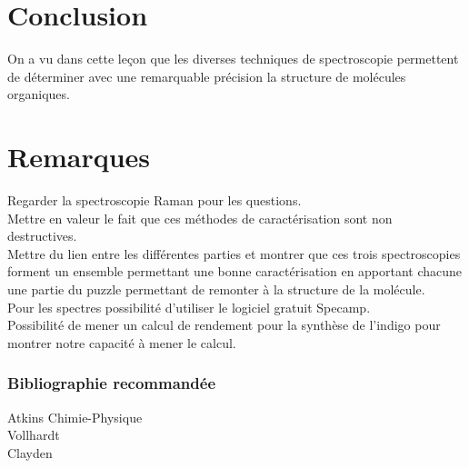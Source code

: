 \documentclass[12pt,prb,aps,epsf]{report}
\begin{document}
\section{Conclusion}
On a vu dans cette leçon que les diverses techniques de spectroscopie permettent de déterminer avec une remarquable précision la structure de molécules organiques.

\section*{Remarques}
Regarder la spectroscopie Raman pour les questions.\\
Mettre en valeur le fait que ces méthodes de caractérisation sont non destructives.\\
Mettre du lien entre les différentes parties et montrer que ces trois spectroscopies forment un ensemble permettant une bonne caractérisation en apportant chacune une partie du puzzle permettant de remonter à la structure de la molécule.\\
Pour les spectres possibilité d'utiliser le logiciel gratuit Specamp.\\
Possibilité de mener un calcul de rendement pour la synthèse de l'indigo pour montrer notre capacité à mener le calcul.
\subsubsection{Bibliographie recommandée}
Atkins Chimie-Physique\\
Vollhardt\\
Clayden
\end{document}

